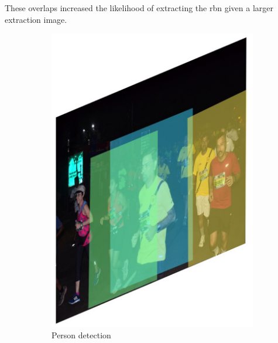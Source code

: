These overlaps increased the likelihood of extracting the \gls{rbn} given a larger extraction image.

\begin{landscape}
  \begin{figure}[p]
    \centering
    \begin{subfigure}[b]{0.23\paperwidth}
      \includegraphics[width=\textwidth]{images/processing/yolo_crop_person_detection}
      \caption{Person detection}
    \label{fig:processing_pipeline:person_filtering:yolo_crop_person_detection}
    \end{subfigure}
    \begin{subfigure}[b]{0.23\paperwidth}

\end{subfigure}
\end{figure}
\end{landscape}
